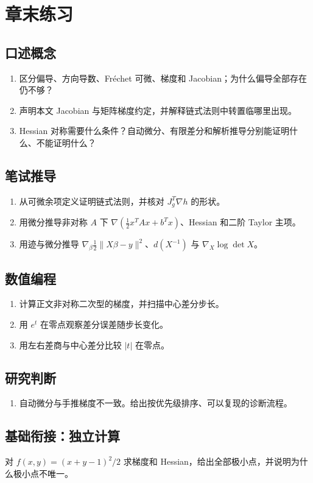 \section*{章末练习}
\begingroup\small
\subsection*{口述概念}
\begin{enumerate}[nosep,leftmargin=*]
  \item 区分偏导、方向导数、Fréchet 可微、梯度和 Jacobian；为什么偏导全部存在仍不够？
  \item 声明本文 Jacobian 与矩阵梯度约定，并解释链式法则中转置临哪里出现。
  \item Hessian 对称需要什么条件？自动微分、有限差分和解析推导分别能证明什么、不能证明什么？
\end{enumerate}

\subsection*{笔试推导}
\begin{enumerate}[nosep,leftmargin=*]
  \item 从可微余项定义证明链式法则，并核对 $J_g^T\nabla h$ 的形状。
  \item 用微分推导非对称 $A$ 下 $\nabla(\tfrac12x^TAx+b^Tx)$、Hessian 和二阶 Taylor 主项。
  \item 用迹与微分推导 $\nabla_\beta\tfrac12\lVert X\beta-y\rVert^2$、$d(X^{-1})$ 与 $\nabla_X\log\det X$。
\end{enumerate}

\subsection*{数值编程}
\begin{enumerate}[leftmargin=*]
  \item 计算正文非对称二次型的梯度，并扫描中心差分步长。
  \item 用 $e^t$ 在零点观察差分误差随步长变化。
  \item 用左右差商与中心差分比较 $|t|$ 在零点。
\end{enumerate}

\subsection*{研究判断}
\begin{enumerate}[nosep,leftmargin=*]
  \item 自动微分与手推梯度不一致。给出按优先级排序、可以复现的诊断流程。
\end{enumerate}
\endgroup


\MFQMappedUpperChFiveQuestions

\subsection*{基础衔接：独立计算}
对 $f(x,y)=(x+y-1)^2/2$ 求梯度和 Hessian，给出全部极小点，并说明为什么极小点不唯一。
